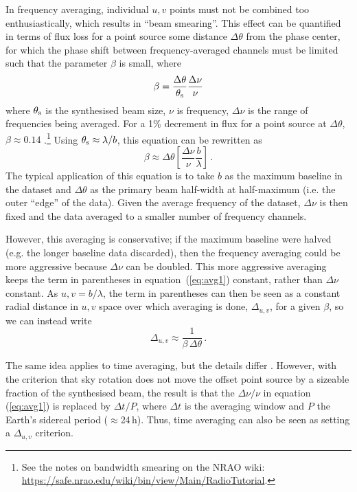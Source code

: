 \documentclass[fleqn,usenatbib]{rasti}
\begin{document}
In frequency averaging, individual $u,v$ points must not be combined too enthusiastically, which results in ``beam smearing''. This effect can be quantified in terms of flux loss for a point source some distance $\Delta \theta$ from the phase center, for which the phase shift between frequency-averaged channels must be limited such that the parameter $\beta$ is small, where
\begin{equation}
    \beta = \frac{\Delta \theta}{\theta_{\rm s}} \frac{\Delta \nu}{\nu}
\end{equation}
where $\theta_{\rm s}$ is the synthesised beam size, $\nu$ is frequency, $\Delta \nu$ is the range of frequencies being averaged. For a 1\% decrement in flux for a point source at $\Delta \theta$, $\beta \approx 0.14$ \citep{1989ASPC....6..247B}.\footnote{See the notes on bandwidth smearing on the NRAO wiki: \href{https://safe.nrao.edu/wiki/bin/view/Main/RadioTutorial}{https://safe.nrao.edu/wiki/bin/view/Main/RadioTutorial}.} Using $\theta_{\rm s} \approx \lambda/b$, this equation can be rewritten as
\begin{equation}\label{eq:avg1}
    \beta \approx \Delta \theta \left[ \frac{\Delta \nu}{\nu} \frac{b}{\lambda} \right] \, .
\end{equation}
The typical application of this equation is to take $b$ as the maximum baseline in the dataset and $\Delta \theta$ as the primary beam half-width at half-maximum (i.e. the outer ``edge'' of the data). Given the average frequency of the dataset, $\Delta \nu$ is then fixed and the data averaged to a smaller number of frequency channels.

However, this averaging is conservative; if the maximum baseline were halved (e.g. the longer baseline data discarded), then the frequency averaging could be more aggressive because $\Delta \nu$ can be doubled. This more aggressive averaging keeps the term in parentheses in equation~(\ref{eq:avg1}) constant, rather than $\Delta \nu$ constant. As $u,v = b/\lambda$, the term in parentheses can then be seen as a constant radial distance in $u,v$ space over which averaging is done, $\Delta_{u,v}$, for a given $\beta$, so we can instead write
\begin{equation}\label{eq:avg2}
    \Delta_{u,v} \approx \frac{1}{\beta \, \Delta \theta} \, .
\end{equation}

The same idea applies to time averaging, but the details differ \citep{1989ASPC....6..247B}. However, with the criterion that sky rotation does not move the offset point source by a sizeable fraction of the synthesised beam, the result is that the $\Delta \nu / \nu$ in equation (\ref{eq:avg1}) is replaced by $\Delta t / P$, where $\Delta t$ is the averaging window and $P$ the Earth's sidereal period ($\approx$24\,h). Thus, time averaging can also be seen as setting a $\Delta_{u,v}$ criterion.
\end{document}
